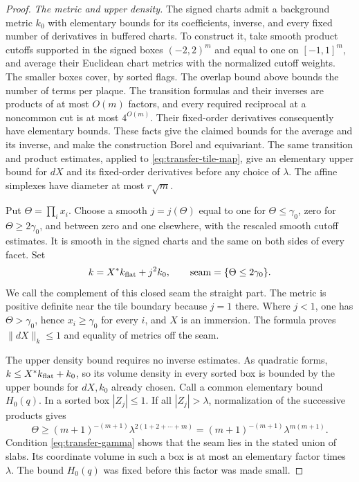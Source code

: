 \begin{proof}
\medskip\noindent\emph{The metric and upper density.}
The signed charts admit a background metric \(k_0\) with elementary
bounds for its coefficients, inverse, and every fixed number of
derivatives in buffered charts.  To construct it, take smooth product
cutoffs supported in the signed boxes \((-2,2)^m\) and equal to one
on \([-1,1]^m\), and average their Euclidean chart metrics with the
normalized cutoff weights.  The smaller boxes cover, by sorted flags.
The overlap bound above bounds the number of terms per plaque.  The
transition formulas and their inverses are products of at most
\(O(m)\) factors, and every required reciprocal at a noncommon cut
is at most \(4^{O(m)}\).  Their fixed-order derivatives consequently
have elementary bounds.  These facts give the claimed bounds for the
average and its inverse, and make the construction Borel and
equivariant.  The same transition and product estimates, applied to
\eqref{eq:transfer-tile-map}, give an elementary upper bound for
\(dX\) and its fixed-order derivatives before any choice of
\(\lambda\).  The affine simplexes have diameter at most \(r\sqrt m\).

Put \(\Theta=\prod_i x_i\).  Choose a smooth \(j=j(\Theta)\) equal
to one for \(\Theta\leq\gamma_0\), zero for
\(\Theta\geq2\gamma_0\), and between zero and one elsewhere, with
the rescaled smooth cutoff estimates.  It is smooth in the signed
charts and the same on both sides of every facet.  Set
\begin{equation}\label{eq:transfer-resolution-metric}
                  k=X^*k_{\rm flat}+j^2 k_0,
       \qquad \text{seam}=\{\Theta\leq2\gamma_0\}.
\end{equation}
We call the complement of this closed seam the straight part.
The metric is positive definite near the tile boundary because \(j=1\) there.  Where
\(j<1\), one has \(\Theta>\gamma_0\), hence \(x_i\geq\gamma_0\) for
every \(i\), and \(X\) is an immersion.  The formula proves
\(\|dX\|_k\leq1\) and equality of metrics off the seam.

The upper density bound requires no inverse estimates.  As quadratic forms,
\(k\leq X^*k_{\rm flat}+k_0\), so its volume density in every sorted
box is bounded by the upper bounds for \(dX,k_0\) already chosen.
Call a common elementary bound \(H_0(q)\).  In a sorted box
\(|Z_j|\leq1\).  If all \(|Z_j|>\lambda\), normalization of the
successive products gives
\[
       \Theta\geq(m+1)^{-(m+1)}
                    \lambda^{2(1+2+\cdots+m)}
              =(m+1)^{-(m+1)}\lambda^{m(m+1)}.
\]
Condition \eqref{eq:transfer-gamma} shows that the seam lies in the
stated union of slabs.  Its coordinate volume in such a box is at
most an elementary factor times \(\lambda\).  The bound \(H_0(q)\)
was fixed before this factor was made small.


\end{proof}
